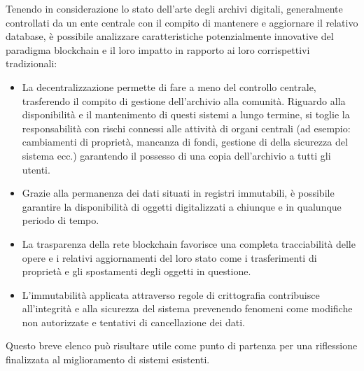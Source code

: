 Tenendo in considerazione lo stato dell'arte degli archivi digitali, generalmente controllati da un ente centrale con il compito di mantenere e aggiornare il relativo database, è possibile analizzare caratteristiche potenzialmente innovative del paradigma blockchain e il loro impatto in rapporto ai loro corrispettivi tradizionali:

\begin{itemize}
\item La decentralizzazione permette di fare a meno del controllo centrale, trasferendo il compito di gestione dell’archivio alla comunità. Riguardo alla disponibilità e il mantenimento di questi sistemi a lungo termine, si toglie la responsabilità con rischi connessi alle attività di organi centrali (ad esempio: cambiamenti di proprietà, mancanza di fondi, gestione di della sicurezza del sistema ecc.) garantendo il possesso di una copia dell’archivio a tutti gli utenti. 
\item Grazie alla permanenza dei dati situati in registri immutabili, è possibile garantire la disponibilità di oggetti digitalizzati a chiunque e in qualunque periodo di tempo. 
\item La trasparenza della rete blockchain favorisce una completa tracciabilità delle opere e i relativi aggiornamenti del loro stato come i trasferimenti di proprietà e gli spostamenti degli oggetti in questione.
\item L'immutabilità applicata attraverso regole di crittografia contribuisce all’integrità e alla sicurezza del sistema prevenendo fenomeni come modifiche non autorizzate e tentativi di cancellazione dei dati.
\end{itemize}

Questo breve elenco può risultare utile come punto di partenza per una riflessione finalizzata al miglioramento di sistemi esistenti.